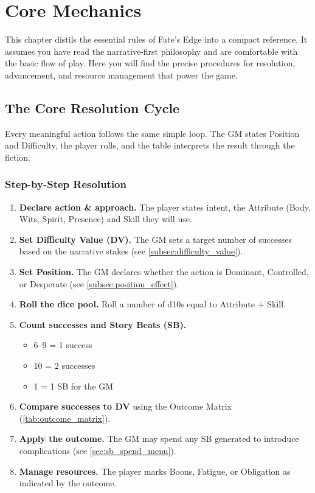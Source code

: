 \chapter{Core Mechanics}\label{chap:core_mechanics}

This chapter distils the essential rules of Fate's Edge into a compact reference.
It assumes you have read the narrative-first philosophy and are comfortable with
the basic flow of play. Here you will find the precise procedures for resolution,
advancement, and resource management that power the game.

\section{The Core Resolution Cycle}\label{sec:resolution_cycle}

Every meaningful action follows the same simple loop. The GM states Position and
Difficulty, the player rolls, and the table interprets the result through the
fiction.

\subsection{Step-by-Step Resolution}\label{subsec:steps}

\begin{enumerate}
    \item \textbf{Declare action \& approach.} The player states intent, the
        Attribute (Body, Wits, Spirit, Presence) and Skill they will use.
    \item \textbf{Set Difficulty Value (DV).} The GM sets a target number of
        successes based on the narrative stakes (see \autoref{subsec:difficulty_value}).
    \item \textbf{Set Position.} The GM declares whether the action is
        Dominant, Controlled, or Desperate (see \autoref{subsec:position_effect}).
    \item \textbf{Roll the dice pool.} Roll a number of d10s equal to
        Attribute + Skill.
    \item \textbf{Count successes and Story Beats (SB).}
        \begin{itemize}
            \item 6--9 = 1 success
            \item 10 = 2 successes
            \item 1 = 1 SB for the GM
        \end{itemize}
    \item \textbf{Compare successes to DV} using the Outcome Matrix
        (\autoref{tab:outcome_matrix}).
    \item \textbf{Apply the outcome.} The GM may spend any SB generated to
        introduce complications (see \autoref{sec:sb_spend_menu}).
    \item \textbf{Manage resources.} The player marks Boons, Fatigue, or
        Obligation as indicated by the outcome.
\end{enumerate}

